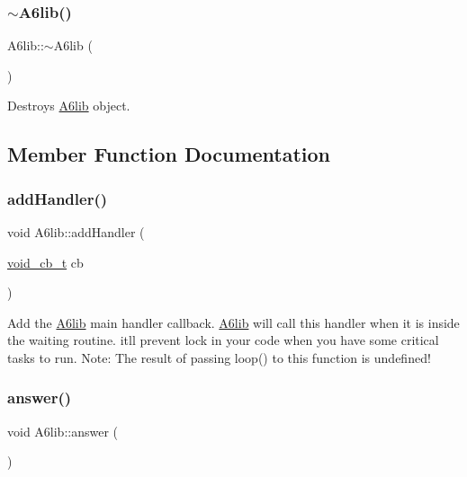 \subsubsection{\texorpdfstring{$\sim$\+A6lib()}{~A6lib()}}
{\footnotesize\ttfamily A6lib\+::$\sim$\+A6lib (\begin{DoxyParamCaption}{ }\end{DoxyParamCaption})}

Destroys \mbox{\hyperlink{class_a6lib}{A6lib}} object. 

\subsection{Member Function Documentation}
\mbox{\label{class_a6lib_ab9580c0720252ad9e2d6b67683e3e88f}} 
\subsubsection{\texorpdfstring{add\+Handler()}{addHandler()}}
{\footnotesize\ttfamily void A6lib\+::add\+Handler (\begin{DoxyParamCaption}\item[{\mbox{\hyperlink{_a6lib_8h_a7a1b65425109a6c0a0d203c1fe9bbbe5}{void\+\_\+cb\+\_\+t}}}]{cb }\end{DoxyParamCaption})}

Add the \mbox{\hyperlink{class_a6lib}{A6lib}} main handler callback. \mbox{\hyperlink{class_a6lib}{A6lib}} will call this handler when it is inside the waiting routine. it\textquotesingle{}ll prevent lock in your code when you have some critical tasks to run. Note\+: The result of passing loop() to this function is undefined! \mbox{\label{class_a6lib_a9ed8e337fcaf0400da3e0b2f518a0db5}} 
\subsubsection{\texorpdfstring{answer()}{answer()}}
{\footnotesize\ttfamily void A6lib\+::answer (\begin{DoxyParamCaption}{ }\end{DoxyParamCaption})}

\mbox{\label{class_a6lib_a05f56b30c3080fc64e5f4bf7d7703866}} 
